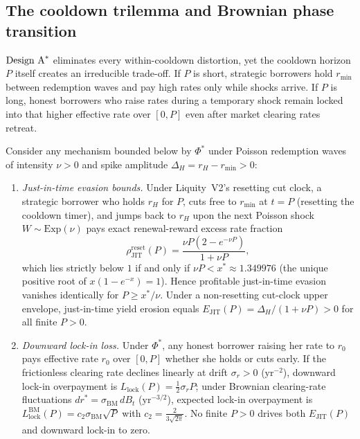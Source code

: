 \subsection{The cooldown trilemma and Brownian phase transition}\label{subsec:trilemma}

$\textup{Design A}^*$ eliminates every within-cooldown distortion, yet the cooldown horizon $P$ itself creates an irreducible trade-off. If $P$ is short, strategic borrowers hold $r_{\min}$ between redemption waves and pay high rates only while shocks arrive. If $P$ is long, honest borrowers who raise rates during a temporary shock remain locked into that higher effective rate over $[0, P]$ even after market clearing rates retreat.

\begin{theorem}\label{thm:trilemma}
Consider any mechanism bounded below by $\Phi^*$ under Poisson redemption waves of intensity $\nu > 0$ and spike amplitude $\Delta_H = r_H - r_{\min} > 0$:
\begin{enumerate}[label=(\roman*), leftmargin=2.2em, itemsep=2pt]
\item \emph{Just-in-time evasion bounds.} Under Liquity~V2's resetting cut clock, a strategic borrower who holds $r_H$ for $P$, cuts free to $r_{\min}$ at $t = P$ (resetting the cooldown timer), and jumps back to $r_H$ upon the next Poisson shock $W \sim \mathrm{Exp}(\nu)$ pays exact renewal-reward excess rate fraction
\begin{equation}\label{eq:jit_reset}
\rho_{\mathrm{JIT}}^{\mathrm{reset}}(P) = \frac{\nu P(2 - e^{-\nu P})}{1 + \nu P},
\end{equation}
which lies strictly below $1$ if and only if $\nu P < x^* \approx 1.349976$ (the unique positive root of $x(1 - e^{-x}) = 1$). Hence profitable just-in-time evasion vanishes identically for $P \ge x^*/\nu$. Under a non-resetting cut-clock upper envelope, just-in-time yield erosion equals $E_{\mathrm{JIT}}(P) = \Delta_H / (1 + \nu P) > 0$ for all finite $P > 0$.
\item \emph{Downward lock-in loss.} Under $\Phi^*$, any honest borrower raising her rate to $r_0$ pays effective rate $r_0$ over $[0, P]$ whether she holds or cuts early. If the frictionless clearing rate declines linearly at drift $\sigma_r > 0$ ($\mathrm{yr}^{-2}$), downward lock-in overpayment is $L_{\mathrm{lock}}(P) = \frac{1}{2}\sigma_r P$; under Brownian clearing-rate fluctuations $dr^* = \sigma_{\mathrm{BM}}\,dB_t$ ($\mathrm{yr}^{-3/2}$), expected lock-in overpayment is $L_{\mathrm{lock}}^{\mathrm{BM}}(P) = c_2 \sigma_{\mathrm{BM}}\sqrt{P}$ with $c_2 = \frac{2}{3\sqrt{2\pi}}$. No finite $P > 0$ drives both $E_{\mathrm{JIT}}(P)$ and downward lock-in to zero.

\end{enumerate}
\end{theorem}
